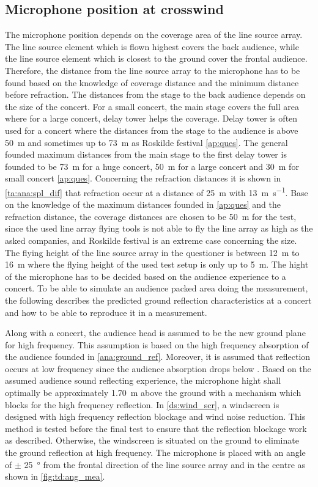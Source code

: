 \subsection{Microphone position at crosswind}
The microphone position depends on the coverage area of the line source array. The line source element which is flown highest covers the back audience, while the line source element which is closest to the ground cover the frontal audience. Therefore, the distance from the line source array to the microphone has to be found based on the knowledge of coverage distance and the minimum distance before refraction. The distances from the stage to the back audience depends on the size of the concert. For a small concert, the main stage covers the full area where for a large concert, delay tower helps the coverage. Delay tower is often used for a concert where the distances from the stage to the audience is above \SI{50}{\meter} and sometimes up to \SI{73}{\meter} as Roskilde festival \autoref{ap:ques}. The general founded maximum distances from the main stage to the first delay tower is founded to be \SI{73}{\meter} for a huge concert, \SI{50}{\meter} for a large concert and \SI{30}{\meter} for small concert \autoref{ap:ques}. 
Concerning the refraction distances it is shown in \autoref{ta:ana:spl_dif} that refraction occur at a distance of \SI{25}{\meter} with \SI{13}{\meter\per\second}.
Base on the knowledge of the maximum distances founded in \autoref{ap:ques} and the refraction distance, the coverage distances are chosen to be \SI{50}{\meter} for the test, since the used line array flying tools is not able to fly the line array as high as the asked companies, and Roskilde festival is an extreme case concerning the size. The flying height of the line source array in the questioner is between \SI{12}{\meter} to \SI{16}{\meter} where the flying height of the used test setup is only up to \SI{5}{\meter}.  
The hight of the microphone has to be decided based on the audience experience to a concert. To be able to simulate an audience packed area doing the measurement, the following describes the predicted ground reflection characteristics at a concert and how to be able to reproduce it in a measurement. 

Along with a concert, the audience head is assumed to be the new ground plane for high frequency. This assumption is based on the high frequency absorption of the audience founded in \autoref{ana:ground_ref}. Moreover, it is assumed that reflection occurs at low frequency since the audience absorption drops below . Based on the assumed audience sound reflecting experience, the microphone hight shall optimally be approximately \SI{1.70}{\meter} above the ground with a mechanism which blocks for the high frequency reflection. In \autoref{ds:wind_scr}, a windscreen is designed with high frequency reflection blockage and wind noise reduction. This method is tested before the final test to ensure that the reflection blockage work as described. Otherwise, the windscreen is situated on the ground to eliminate the ground reflection at high frequency. The microphone is placed with an angle of $\pm$ \SI{25}{\degree} from the frontal direction of the line source array and in the centre as shown in \autoref{fig:td:ang_mea}.

